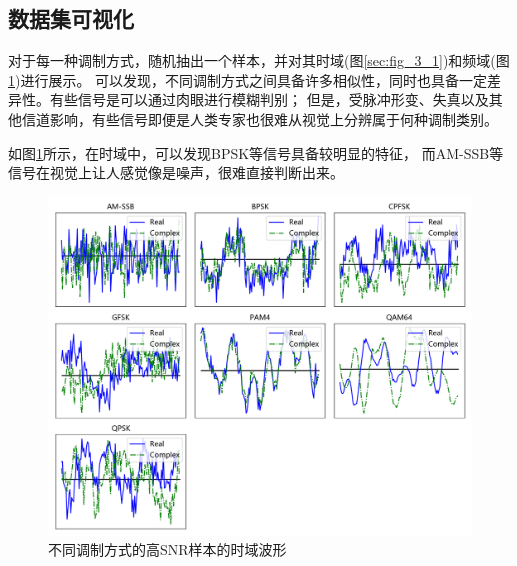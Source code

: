 \subsection{数据集可视化}

对于每一种调制方式，随机抽出一个样本，并对其时域(图\ref{sec:fig_3_1})和频域(图\ref{sec:fig_3_2})进行展示。
可以发现，不同调制方式之间具备许多相似性，同时也具备一定差异性。有些信号是可以通过肉眼进行模糊判别；
但是，受脉冲形变、失真以及其他信道影响，有些信号即便是人类专家也很难从视觉上分辨属于何种调制类别。\par

如图\ref{sec:fig_3_2}所示，在时域中，可以发现BPSK等信号具备较明显的特征，
而AM-SSB等信号在视觉上让人感觉像是噪声，很难直接判断出来。\par

\begin{figure}[!h]
	\centering
	\includegraphics[scale=0.45]{figures/chapter_3/fig_3_2}
	\caption{不同调制方式的高SNR样本的时域波形}\label{sec:fig_3_2}
\end{figure}

